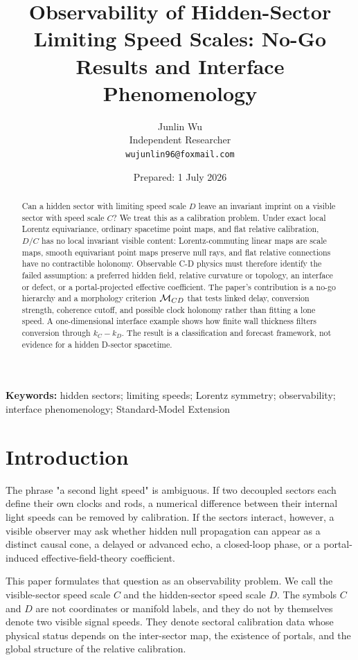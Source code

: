 \documentclass[11pt]{article}
\title{Observability of Hidden-Sector Limiting Speed Scales: No-Go Results and Interface Phenomenology}
\author{Junlin Wu\\
Independent Researcher\\
\texttt{wujunlin96@foxmail.com}}
\date{Prepared: 1 July 2026}
\begin{document}
\maketitle

\begin{abstract}
Can a hidden sector with limiting speed scale \(D\) leave an invariant imprint on a visible sector with speed scale \(C\)? We treat this as a calibration problem. Under exact local Lorentz equivariance, ordinary spacetime point maps, and flat relative calibration, \(D/C\) has no local invariant visible content: Lorentz-commuting linear maps are scale maps, smooth equivariant point maps preserve null rays, and flat relative connections have no contractible holonomy. Observable C-D physics must therefore identify the failed assumption: a preferred hidden field, relative curvature or topology, an interface or defect, or a portal-projected effective coefficient. The paper's contribution is a no-go hierarchy and a morphology criterion \({\cal M}_{CD}\) that tests linked delay, conversion strength, coherence cutoff, and possible clock holonomy rather than fitting a lone speed. A one-dimensional interface example shows how finite wall thickness filters conversion through \(k_C-k_D\). The result is a classification and forecast framework, not evidence for a hidden D-sector spacetime.
\end{abstract}


\noindent\textbf{Keywords:} hidden sectors; limiting speeds; Lorentz symmetry; observability; interface phenomenology; Standard-Model Extension



\section{Introduction}


The phrase "a second light speed" is ambiguous. If two decoupled sectors each define their own clocks and rods, a numerical difference between their internal light speeds can be removed by calibration. If the sectors interact, however, a visible observer may ask whether hidden null propagation can appear as a distinct causal cone, a delayed or advanced echo, a closed-loop phase, or a portal-induced effective-field-theory coefficient.


This paper formulates that question as an observability problem. We call the visible-sector speed scale \(C\) and the hidden-sector speed scale \(D\). The symbols \(C\) and \(D\) are not coordinates or manifold labels, and they do not by themselves denote two visible signal speeds. They denote sectoral calibration data whose physical status depends on the inter-sector map, the existence of portals, and the global structure of the relative calibration.
\end{document}
